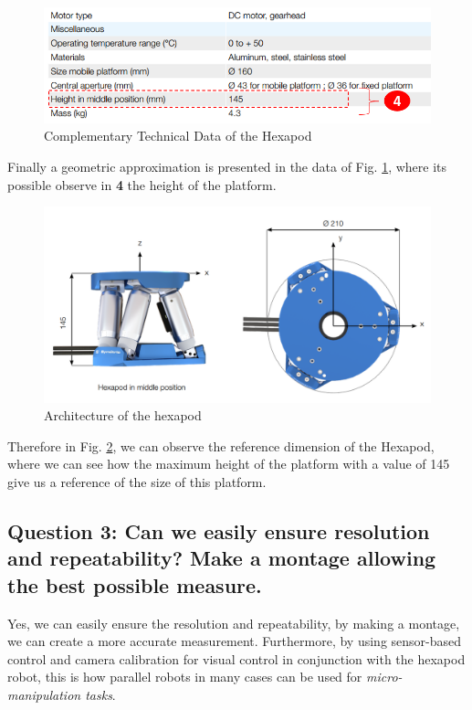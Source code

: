 \documentclass[12pt, twoside]{report}
\begin{document}
\begin{figure}[H]
    \centering
    \includegraphics[width=\textwidth]{TP_2/charact2.png}
    \caption{Complementary Technical Data of the Hexapod}
    \label{fig:char2}
\end{figure}
Finally a geometric approximation is  presented in the data of Fig. \ref{fig:char2}, where its possible observe in \textbf{4} the height of the platform. 

\begin{figure}[H]
    \centering
    \includegraphics[width=\textwidth]{TP_2/hexapod1ac.png}
    \caption{Architecture of the hexapod}
    \label{fig:hexc1}
\end{figure}
Therefore in Fig. \ref{fig:hexc1}, we can observe the reference dimension of the Hexapod, where we can see how the maximum height of the platform with a value of 145 give us a reference of the size of this platform.
    


\subsection{Question 3: Can we easily ensure resolution and repeatability? Make a montage allowing the best possible measure.}

Yes, we can easily ensure the resolution and repeatability, by making a montage, we can create a more accurate measurement. Furthermore, by using sensor-based control and camera calibration for visual control in conjunction with the hexapod robot, this is how parallel robots in many cases can be used for \textit{micro-manipulation tasks}.
\end{document}
